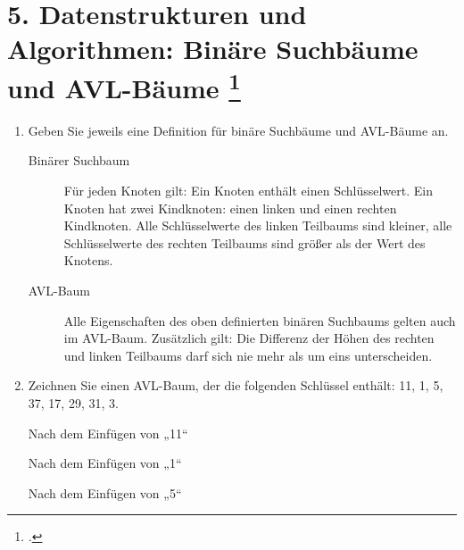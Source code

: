 \documentclass{bschlangaul-aufgabe}
\begin{document}
\section{5. Datenstrukturen und Algorithmen: Binäre Suchbäume und AVL-Bäume
\footcite{examen:46115:2010:03}}

\begin{enumerate}
\item Geben Sie jeweils eine Definition für binäre Suchbäume und
AVL-Bäume an.

\begin{bAntwort}

\begin{description}
\item[Binärer Suchbaum] Für jeden Knoten gilt: Ein Knoten enthält einen
Schlüsselwert. Ein Knoten hat zwei Kindknoten: einen linken und einen
rechten Kindknoten. Alle Schlüsselwerte des linken Teilbaums sind
kleiner, alle Schlüsselwerte des rechten Teilbaums sind größer als der
Wert des Knotens.

\item[AVL-Baum] Alle Eigenschaften des oben definierten binären
Suchbaums gelten auch im AVL-Baum. Zusätzlich gilt: Die Differenz der
Höhen des rechten und linken Teilbaums darf sich nie mehr als um eins
unterscheiden.
\end{description}

\end{bAntwort}

\item Zeichnen Sie einen AVL-Baum, der die folgenden Schlüssel enthält:
11, 1, 5, 37, 17, 29, 31, 3.

\begin{bAntwort}
\begin{bBaum}{Nach dem Einfügen von „11“}
\end{bBaum}

\begin{bBaum}{Nach dem Einfügen von „1“}
\end{bBaum}

\begin{bBaum}{Nach dem Einfügen von „5“}
\end{bBaum}


\end{bAntwort}
\end{enumerate}
\end{document}
